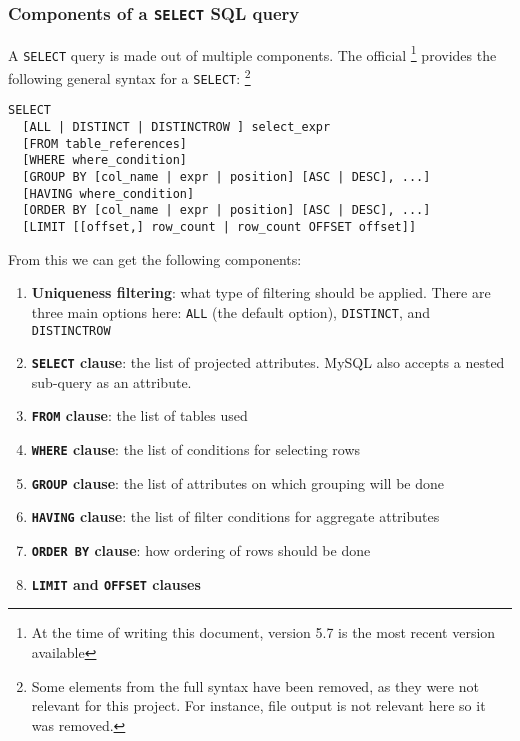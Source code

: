 \subsubsection{Components of a \texttt{SELECT} SQL query}

A \texttt{SELECT} query is made out of multiple components. The official  \cite{mysql:documentation} \footnote{At the time
of writing this document, version 5.7 is the most recent version available} provides the following general syntax for a \texttt{SELECT}:
\footnote{Some elements from the full syntax have been removed, as they
were not relevant for this project. For instance, file output is not relevant here so it
was removed.}

\begin{verbatim}
SELECT
  [ALL | DISTINCT | DISTINCTROW ] select_expr
  [FROM table_references]
  [WHERE where_condition]
  [GROUP BY [col_name | expr | position] [ASC | DESC], ...]
  [HAVING where_condition]
  [ORDER BY [col_name | expr | position] [ASC | DESC], ...]
  [LIMIT [[offset,] row_count | row_count OFFSET offset]]
\end{verbatim}

From this we can get the following components:

\begin{enumerate}
  \item \textbf{Uniqueness filtering}: what type of filtering should be applied. There are
  three main options here: \texttt{ALL} (the default option),
  \texttt{DISTINCT}, and \texttt{DISTINCTROW}
  \item \textbf{\texttt{SELECT} clause}: the list of projected attributes. MySQL
  also accepts a nested sub-query as an attribute.
  \item \textbf{\texttt{FROM} clause}: the list of tables used
  \item \textbf{\texttt{WHERE} clause}: the list of conditions for selecting rows
  \item \textbf{\texttt{GROUP} clause}: the list of attributes on which grouping will be
  done
  \item \textbf{\texttt{HAVING} clause}: the list of filter conditions for aggregate
  attributes
  \item \textbf{\texttt{ORDER BY} clause}: how ordering of rows should be done
  \item \textbf{\texttt{LIMIT} and \texttt{OFFSET} clauses}
\end{enumerate}

